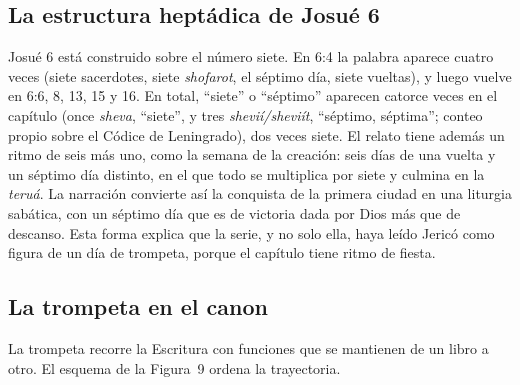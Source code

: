 \documentclass[11pt,letterpaper]{article}
\begin{document}
\subsection{La estructura heptádica de Josué 6}
Josué 6 está construido sobre el número siete. En 6:4 la palabra aparece cuatro veces (siete sacerdotes, siete \emph{shofarot}, el séptimo día, siete vueltas), y luego vuelve en 6:6, 8, 13, 15 y 16. En total, ``siete'' o ``séptimo'' aparecen catorce veces en el capítulo (once \emph{sheva}, ``siete'', y tres \emph{shevií/sheviít}, ``séptimo, séptima''; conteo propio sobre el Códice de Leningrado), dos veces siete. El relato tiene además un ritmo de seis más uno, como la semana de la creación: seis días de una vuelta y un séptimo día distinto, en el que todo se multiplica por siete y culmina en la \emph{teruá}. La narración convierte así la conquista de la primera ciudad en una liturgia sabática, con un séptimo día que es de victoria dada por Dios más que de descanso. Esta forma explica que la serie, y no solo ella, haya leído Jericó como figura de un día de trompeta, porque el capítulo tiene ritmo de fiesta.

\subsection{La trompeta en el canon}
La trompeta recorre la Escritura con funciones que se mantienen de un libro a otro. El esquema de la Figura~9 ordena la trayectoria.
\end{document}
